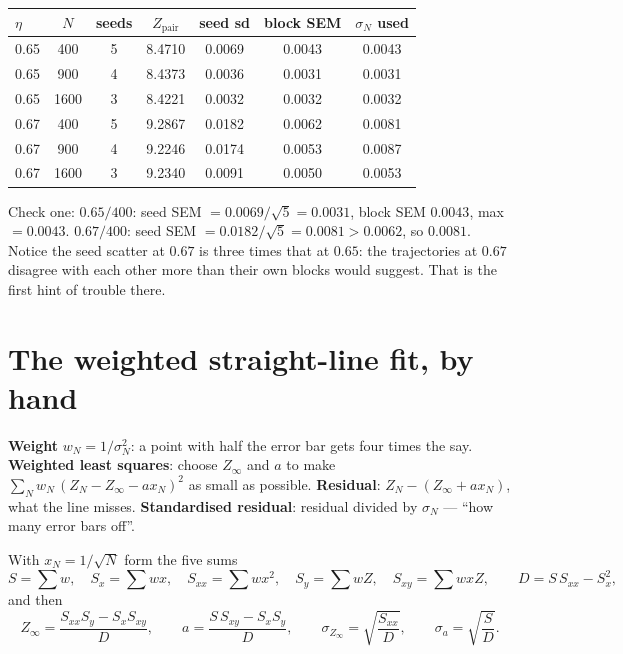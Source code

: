 \documentclass[11pt,a4paper]{article}
\begin{document}
\begin{num}
\begin{tabular}{@{}lcccccc@{}}
\toprule
$\eta$ & $N$ & seeds & $Z_{\mathrm{pair}}$ & seed sd & block SEM & $\sigma_N$ used\\
\midrule
0.65 & 400 & 5 & 8.4710 & 0.0069 & 0.0043 & 0.0043\\
0.65 & 900 & 4 & 8.4373 & 0.0036 & 0.0031 & 0.0031\\
0.65 & 1600 & 3 & 8.4221 & 0.0032 & 0.0032 & 0.0032\\
\midrule
0.67 & 400 & 5 & 9.2867 & 0.0182 & 0.0062 & 0.0081\\
0.67 & 900 & 4 & 9.2246 & 0.0174 & 0.0053 & 0.0087\\
0.67 & 1600 & 3 & 9.2340 & 0.0091 & 0.0050 & 0.0053\\
\bottomrule
\end{tabular}

Check one: $0.65/400$: seed SEM $= 0.0069/\sqrt5 = 0.0031$, block SEM $0.0043$, max $= 0.0043$. $0.67/400$: seed SEM $= 0.0182/\sqrt5 = 0.0081 > 0.0062$, so $0.0081$. Notice the seed scatter at $0.67$ is three times that at $0.65$: the trajectories at $0.67$ disagree with each other more than their own blocks would suggest. That is the first hint of trouble there.
\end{num}

\section{The weighted straight-line fit, by hand}

\begin{term}
\textbf{Weight} $w_N = 1/\sigma_N^2$: a point with half the error bar gets four times the say. \textbf{Weighted least squares}: choose $Z_\infty$ and $a$ to make $\sum_N w_N\,(Z_N - Z_\infty - a x_N)^2$ as small as possible. \textbf{Residual}: $Z_N - (Z_\infty + a x_N)$, what the line misses. \textbf{Standardised residual}: residual divided by $\sigma_N$ --- ``how many error bars off''.
\end{term}

With $x_N = 1/\sqrt N$ form the five sums
\begin{equation}
S = \sum w,\quad S_x = \sum w x,\quad S_{xx} = \sum w x^2,\quad S_y = \sum w Z,\quad S_{xy} = \sum w x Z,\qquad D = S\,S_{xx} - S_x^2,
\end{equation}
and then
\begin{equation}
\boxed{\;Z_\infty = \frac{S_{xx}S_y - S_xS_{xy}}{D},\qquad a = \frac{S\,S_{xy} - S_xS_y}{D},\qquad
\sigma_{Z_\infty} = \sqrt{\frac{S_{xx}}{D}},\qquad \sigma_a = \sqrt{\frac{S}{D}}.\;}
\end{equation}
\end{document}
